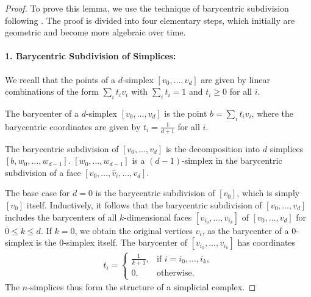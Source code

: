 \begin{proof}
To prove this lemma, we use the technique of barycentric subdivision following \cite[§2.21]{hatcher2005algebraic}. The proof is divided into four elementary steps, which initially are geometric and become more algebraic over time.

\paragraph{1. Barycentric Subdivision of Simplices:} We recall that the points of a $d$-simplex $[v_0, \ldots, v_d]$ are given by linear combinations of the form $\sum_{i} t_i v_i$ with $\sum_i t_i = 1$ and $t_i \geq 0$ for all $i$.

\begin{definition}[Barycenter]
The barycenter of a $d$-simplex $[v_0, \ldots, v_d]$ is the point $b = \sum_i t_i v_i$, where the barycentric coordinates are given by $t_i = \frac{1}{d+1}$ for all $i$.
\end{definition}

\begin{definition}
The barycentric subdivision of $[v_0, \ldots, v_d]$ is the decomposition into $d$ simplices $[b, w_0, \ldots, w_{d-1}]$. $[w_0, \ldots, w_{d-1}]$ is a $(d-1)$-simplex in the barycentric subdivision of a face $[v_0, \ldots, \hat{v}_i, \ldots, v_d]$.
\end{definition}

The base case for $d=0$ is the barycentric subdivision of $[v_0]$, which is simply $[v_0]$ itself. Inductively, it follows that the barycentric subdivision of $[v_0, \ldots, v_d]$ includes the barycenters of all $k$-dimensional faces $[v_{i_0}, \ldots, v_{i_k}]$ of $[v_0, \ldots, v_d]$ for $0 \leq k \leq d$. If $k=0$, we obtain the original vertices $v_i$, as the barycenter of a $0$-simplex is the $0$-simplex itself. The barycenter of $[v_{i_0}, \ldots, v_{i_k}]$ has coordinates
\begin{align}
    t_i = \begin{cases}
    \frac{1}{k+1}, & \text{if } i = i_0, \ldots, i_k,\\
    0, & \text{otherwise}.
    \end{cases}
\end{align}
The \(n\)-simplices thus form the structure of a simplicial complex.


\end{proof}
